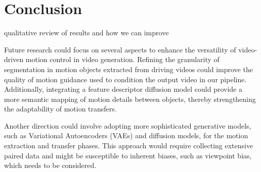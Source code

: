 \section{Conclusion}

qualitative review of results and how we can improve

Future research could focus on several aspects to enhance the versatility of video-driven motion control in video generation. Refining the granularity of segmentation in motion objects extracted from driving videos could improve the quality of motion guidance used to condition the output video in our pipeline. Additionally, integrating a feature descriptor diffusion model \cite{Dutt_2024_CVPR, luo2024diffusion} could provide a more semantic mapping of motion details between objects, thereby strengthening the adaptability of motion transfers.

Another direction could involve adopting more sophisticated generative models, such as Variational Autoencoders (VAEs) and diffusion models, for the motion extraction and transfer phases. This approach would require collecting extensive paired data and might be susceptible to inherent biases, such as viewpoint bias, which needs to be considered.
